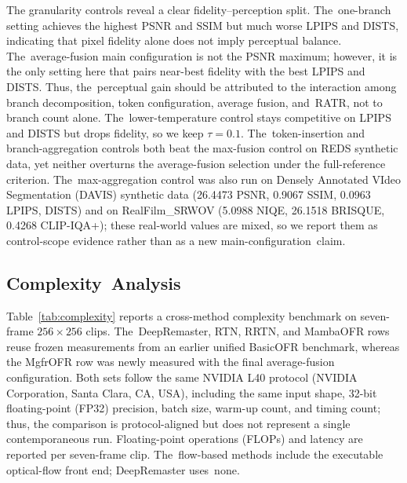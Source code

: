 \documentclass[symmetry,article,accept,pdftex,moreauthors]{Definitions/mdpi}
\begin{document}
The granularity controls reveal a clear fidelity--perception split. The~one-branch setting achieves the highest PSNR and SSIM but much worse LPIPS and DISTS, indicating that pixel fidelity alone does not imply perceptual balance. The~average-fusion main configuration is not the PSNR maximum; however, it is the only setting here that pairs near-best fidelity with the best LPIPS and DISTS. Thus, the~perceptual gain should be attributed to the interaction among branch decomposition, token configuration, average fusion, and~RATR, not to branch count alone. The~lower-temperature control stays competitive on LPIPS and DISTS but drops fidelity, so we keep $\tau=0.1$. The~token-insertion and branch-aggregation controls both beat the max-fusion control on REDS synthetic data, yet neither overturns the average-fusion selection under the full-reference criterion. The~max-aggregation control was also run on Densely Annotated VIdeo Segmentation (DAVIS) synthetic data (26.4473 PSNR, 0.9067 SSIM, 0.0963 LPIPS,  DISTS) and on RealFilm\_SRWOV (5.0988 NIQE, 26.1518 BRISQUE, 0.4268 CLIP-IQA+); these real-world values are mixed, so we report them as control-scope evidence rather than as a new main-configuration~claim.



\subsection{Complexity~Analysis}
\label{subsec:complexity}

Table~\ref{tab:complexity} reports a cross-method complexity benchmark on seven-frame $256\times256$ clips. The~DeepRemaster, RTN, RRTN, and MambaOFR rows reuse frozen measurements from an earlier unified BasicOFR benchmark, whereas the MgfrOFR row was newly measured with the final average-fusion configuration. Both sets follow the same NVIDIA L40 protocol (NVIDIA Corporation, Santa Clara, CA, USA), including the same input shape, 32-bit floating-point (FP32) precision, batch size, warm-up count, and timing count; thus, the comparison is protocol-aligned but does not represent a single contemporaneous run. Floating-point operations (FLOPs) and latency are reported per seven-frame clip. The~flow-based methods include the executable optical-flow front end; DeepRemaster uses~none.
\end{document}
